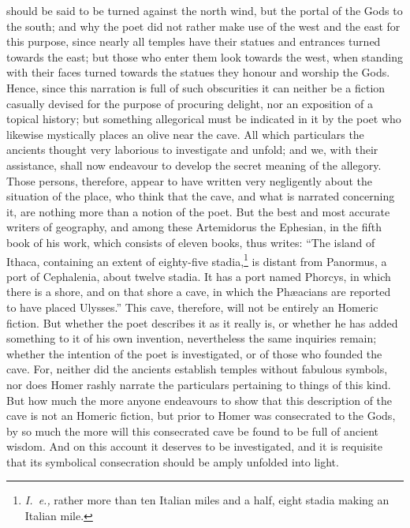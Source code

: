 \documentclass[a4paper,12pt]{article}
\begin{document}
should be said to be turned against the north wind, but the portal of the Gods
to the south; and why the poet did not rather make use of the west and the east
for this purpose, since nearly all temples have their statues and entrances
turned towards the east; but those who enter them look towards the west, when
standing with their faces turned towards the statues they honour and worship
the Gods. Hence, since this narration is full of such obscurities it can
neither be a fiction casually devised for the purpose of procuring delight, nor
an exposition of a topical history; but something allegorical must be indicated
in it by the poet who likewise mystically places an olive near the cave. All
which particulars the ancients thought very laborious to investigate and
unfold; and we, with their assistance, shall now endeavour to develop the
secret meaning of the allegory. Those persons, therefore, appear to have
written very negligently about the situation of the place, who think that the
cave, and what is narrated concerning it, are nothing more than a notion of the
poet. But the best and most accurate writers of geography, and among these
Artemidorus the Ephesian, in the fifth book of his work, which consists of
eleven books, thus writes: ``The island of Ithaca, containing an extent of
eighty-five stadia,\footnote{\textit{I.~e.,} rather more than ten Italian miles
and a half, eight stadia making an Italian mile.} is distant from Panormus, a
port of Cephalenia, about twelve stadia. It has a port named Phorcys, in which
there is a shore, and on that shore a cave, in which the Ph{\ae}acians are
reported to have placed Ulysses.'' This cave, therefore, will not be entirely
an Homeric fiction. But whether the poet describes it as it really is, or
whether he has added something to it of his own invention, nevertheless the
same inquiries remain; whether the intention of the poet is investigated, or of
those who founded the cave. For, neither did the ancients establish temples
without fabulous symbols, nor does Homer rashly narrate the particulars
pertaining to things of this kind. But how much the more anyone endeavours to
show that this description of the cave is not an Homeric fiction, but prior to
Homer was consecrated to the Gods, by so much the more will this consecrated
cave be found to be full of ancient wisdom. And on this account it deserves to
be investigated, and it is requisite that its symbolical consecration should be
amply unfolded into light.
\end{document}
